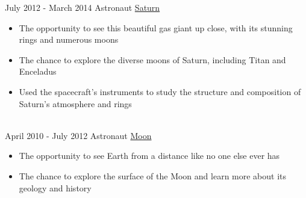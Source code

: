 \begin{twenty}
	\twentyitem
	{July 2012 - }
	{March 2014}
	{Astronaut}
	{\href{https://en.wikipedia.org/wiki/Saturn}{Saturn}}
	{}
	{\begin{itemize}
			\item The opportunity to see this beautiful gas giant up close, with its stunning rings and numerous moons
			\item The chance to explore the diverse moons of Saturn, including Titan and Enceladus
			\item Used the spacecraft's instruments to study the structure and composition of Saturn's atmosphere and rings
	\end{itemize}}
	\\
		\twentyitem
		{April 2010 -}
		{July 2012}
		{Astronaut}
		{\href{https://en.wikipedia.org/wiki/Moon}{Moon}}
		{}
		{
			{\begin{itemize}
				\item The opportunity to see Earth from a distance like no one else ever has
				\item The chance to explore the surface of the Moon and learn more about its geology and history
			\end{itemize}}
		}
		\\ 
\end{twenty}
